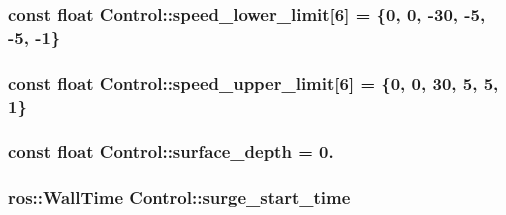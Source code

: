 \subsubsection[{\texorpdfstring{speed\+\_\+lower\+\_\+limit}{speed_lower_limit}}]{\setlength{\rightskip}{0pt plus 5cm}const float Control\+::speed\+\_\+lower\+\_\+limit\mbox{[}6\mbox{]} = \{0, 0, -\/30, -\/5, -\/5, -\/1\}\hspace{0.3cm}{\ttfamily [private]}}\hypertarget{classControl_a8a4e9a6981c6adda2ca45420e7b035b8}{}\label{classControl_a8a4e9a6981c6adda2ca45420e7b035b8}
\subsubsection[{\texorpdfstring{speed\+\_\+upper\+\_\+limit}{speed_upper_limit}}]{\setlength{\rightskip}{0pt plus 5cm}const float Control\+::speed\+\_\+upper\+\_\+limit\mbox{[}6\mbox{]} = \{0, 0, 30, 5, 5, 1\}\hspace{0.3cm}{\ttfamily [private]}}\hypertarget{classControl_a98641c8463a36108205726d108ebf101}{}\label{classControl_a98641c8463a36108205726d108ebf101}
\subsubsection[{\texorpdfstring{surface\+\_\+depth}{surface_depth}}]{\setlength{\rightskip}{0pt plus 5cm}const float Control\+::surface\+\_\+depth = 0.\hspace{0.3cm}{\ttfamily [private]}}\hypertarget{classControl_aea3797b8e27792b1d7887b92da69486e}{}\label{classControl_aea3797b8e27792b1d7887b92da69486e}
\subsubsection[{\texorpdfstring{surge\+\_\+start\+\_\+time}{surge_start_time}}]{\setlength{\rightskip}{0pt plus 5cm}ros\+::\+Wall\+Time Control\+::surge\+\_\+start\+\_\+time\hspace{0.3cm}{\ttfamily [private]}}\hypertarget{classControl_ac4d0e192a272517b5921915e65869b7b}{}\label{classControl_ac4d0e192a272517b5921915e65869b7b}

